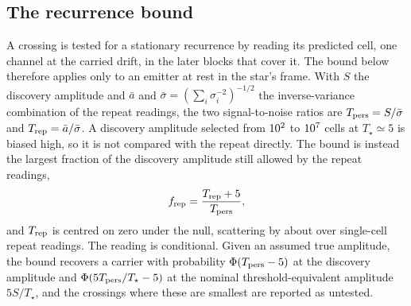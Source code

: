 \subsection{The recurrence bound}
\label{sec:nullscatter}

A crossing is tested for a stationary recurrence by reading its predicted
cell, one channel at the carried drift, in the later blocks that cover it.
The bound below therefore applies only to an emitter at rest in the star's
frame. With $S$
the discovery amplitude and $\bar{a}$ and $\bar{\sigma}=(\sum_i
\sigma_i^{-2})^{-1/2}$ the inverse-variance combination of the repeat
readings, the two signal-to-noise ratios are $T_{\rm pers}=S/\bar{\sigma}$
and $T_{\rm rep}=\bar{a}/\bar{\sigma}$. A discovery amplitude selected from
$10^{2}$ to $10^{7}$ cells at $T_\star\simeq5$ is
biased high, so it is not compared with the repeat directly. The bound is
instead the largest fraction of the discovery amplitude still allowed by the
repeat readings,
\begin{equation*}
f_{\rm rep}=\frac{T_{\rm rep}+5}{T_{\rm pers}},
\end{equation*}
and $T_{\rm rep}$ is centred on zero under the null, scattering by
\NuNullSd{} about \NuNullMean{} over \NuNullN{} single-cell repeat readings.
The reading is conditional. Given an assumed true amplitude, the bound
recovers a carrier with probability $\Phi(T_{\rm pers}-5)$ at the discovery
amplitude and $\Phi(5T_{\rm pers}/T_\star-5)$ at the nominal
threshold-equivalent amplitude $5S/T_\star$, and the \HjNPowerLo{} crossings
where these are smallest are reported as untested.

